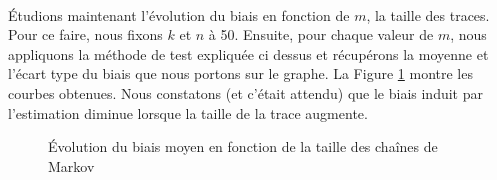 \documentclass[a4paper,titlepage]{report}
\begin{document}
\paragraph{} Étudions maintenant l'évolution du biais en fonction de $m$, la taille des traces. Pour ce faire, nous fixons $k$ et $n$ à 50. Ensuite, pour chaque valeur de $m$, nous appliquons la méthode de test expliquée ci dessus et récupérons la moyenne et l'écart type du biais que nous portons sur le graphe. La Figure \ref{fig:evol_m_bias} montre les courbes obtenues. Nous constatons (et c'était attendu) que le biais induit par l'estimation diminue lorsque la taille de la trace augmente.
\begin{figure}[h]
	\center
	\caption{Évolution du biais moyen en fonction de la taille des chaînes de Markov}
	\label{fig:evol_m_bias}
\end{figure}
\end{document}
